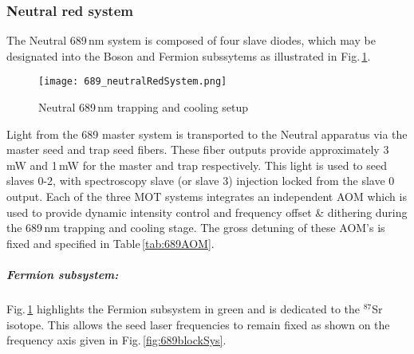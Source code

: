 %
%


\subsubsection{Neutral red system}
The Neutral 689\,nm system is composed of four slave diodes, which may be designated into the Boson and Fermion subssytems as illustrated in Fig.\,\ref{fig:neutralRed}.
	\begin{figure} 
		\centerline{
		\texttt{[image: 689\_neutralRedSystem.png]}}
		\caption{Neutral 689\,nm trapping and cooling setup}{}
		\label{fig:neutralRed}
	\end{figure}
Light from the 689 master system is transported to the Neutral apparatus via the master seed and trap seed fibers.
These fiber outputs provide approximately 3\,mW and 1\,mW for the master and trap respectively.
This light is used to seed slaves 0-2, with spectroscopy slave (or slave 3) injection locked from the slave 0 output.
Each of the three MOT systems integrates an independent AOM which is used to provide dynamic intensity control and frequency offset \& dithering during the 689\,nm trapping and cooling stage.
The gross detuning of these AOM's is fixed and specified in Table\,\ref{tab:689AOM}.

\subparagraph{Fermion subsystem:}
Fig.\,\ref{fig:neutralRed} highlights the Fermion subsystem in green and is dedicated to the $^{87}$Sr isotope.
This allows the seed laser frequencies to remain fixed as shown on the frequency axis given in Fig.\,\ref{fig:689blockSys}.

